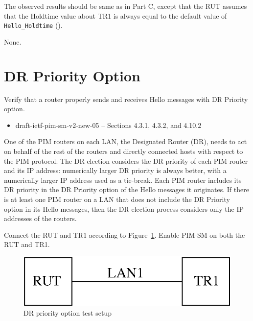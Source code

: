 \documentclass[11pt]{report}
\begin{document}

The observed results should be same as in Part C, except that
the RUT assumes that the Holdtime value about TR1 is always equal to the
default value of \verb=Hello_Holdtime= ({\PimsmHelloHoldtime}).

None.

\newpage
\section{DR Priority Option}

Verify that a router properly sends and receives Hello messages with DR
Priority option.

\begin{itemize}
  \item draft-ietf-pim-sm-v2-new-05 -- Sections 4.3.1, 4.3.2, and 4.10.2
\end{itemize}

One of the PIM routers on each LAN, the Designated Router (DR), needs to act
on behalf of the rest of the routers and directly connected hosts with respect
to the PIM protocol. The DR election considers the DR priority of each
PIM router and its IP address: numerically larger DR priority is always
better, with a numerically larger IP address used as a tie-break. Each PIM
router includes its DR priority in the DR Priority option of the Hello
messages it originates. If there is at least one PIM router on a LAN that does
not include the DR Priority option in its Hello messages, then the DR election
process considers only the IP addresses of the routers.

Connect the RUT and TR1 according to Figure~\ref{fig:dr_priority_option}.
Enable PIM-SM on both the RUT and TR1.

\begin{figure}[htbp]
  \begin{center}
    \includegraphics[scale=0.8]{figs/pim_test_2_5_dr_priority_option}
    \caption{DR priority option test setup}
    \label{fig:dr_priority_option}
  \end{center}
\end{figure}
\end{document}
